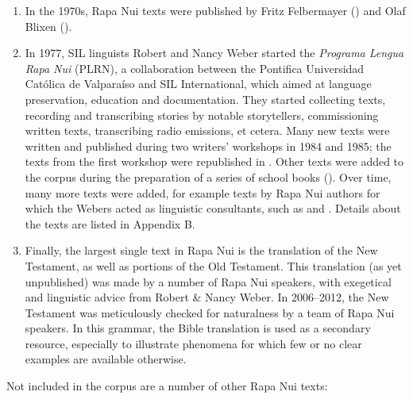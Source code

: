 \begin{enumerate}
\item 
In the 1970s, Rapa Nui texts were published by Fritz Felbermayer (\citealt{Felbermayer1971,Felbermayer1973,Felbermayer1978}) and Olaf Blixen (\citealt{Blixen1973,Blixen1974}). 

\item 
In 1977, SIL linguists Robert and Nancy Weber started the \textit{Programa Lengua Rapa Nui} (PLRN), a collaboration between the Pontifica Universidad Católica de Valparaíso and SIL International, which aimed at language preservation, education and documentation. They started collecting texts, recording and transcribing stories by notable storytellers, commissioning written texts, transcribing radio emissions, et cetera. Many new texts were written and published during two writers’ workshops in 1984 and 1985; the texts from the first workshop were republished in \citet{PatéTukiTukiTepano1986}. Other texts were added to the corpus during the preparation of a series of school books (\citealt{WeberWeber1990Mai,WeberWeber1990Mo}). Over time, many more texts were added, for example texts by Rapa Nui authors for which the Webers acted as linguistic consultants, such as \citet{CuadrosHucke2008} and \citet{PakaratiTuki2010}. Details about the texts are listed in Appendix B.

\item 
Finally, the largest single text in Rapa Nui is the translation of the New Testament, as well as portions of the Old Testament. This translation (as yet unpublished) was made by a number of Rapa Nui speakers, with exegetical and linguistic advice from Robert \& Nancy Weber. In 2006–2012, the New Testament was meticulously checked for naturalness by a team of Rapa Nui speakers. In this grammar, the Bible translation is used as a secondary resource, especially to illustrate phenomena for which few or no clear examples are available otherwise.

\end{enumerate}

Not included in the corpus are a number of other Rapa Nui texts:

